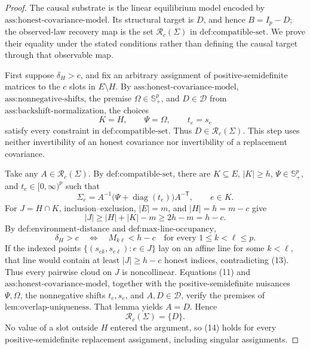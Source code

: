 \documentclass{article}
\begin{document}
\begin{proof}
The causal substrate is the linear equilibrium model encoded by \(\text{ass:honest-covariance-model}\).  Its structural target is \(D\), and hence \(B=I_p-D\); the observed-law recovery map is the set \(\mathcal R_c(\Sigma)\) in \(\text{def:compatible-set}\).  We prove their equality under the stated conditions rather than defining the causal target through that observable map.

First suppose \(\delta_H>c\), and fix an arbitrary assignment of positive-semidefinite matrices to the \(c\) slots in \(E\setminus H\).  By \(\text{ass:honest-covariance-model}\), \(\text{ass:nonnegative-shifts}\), the premise \(\Omega\in\mathbb S_+^p\), and \(D\in\mathcal D\) from \(\text{ass:backshift-normalization}\), the choices
\[
 K=H,
 \qquad \Psi=\Omega,
 \qquad t_e=s_e
\]
satisfy every constraint in \(\text{def:compatible-set}\).  Thus \(D\in\mathcal R_c(\Sigma)\).  This step uses neither invertibility of an honest covariance nor invertibility of a replacement covariance.

Take any \(A\in\mathcal R_c(\Sigma)\).  By \(\text{def:compatible-set}\), there are \(K\subseteq E\), \(|K|\ge h\), \(\Psi\in\mathbb S_+^p\), and \(t_e\in[0,\infty)^p\) such that
\[
 \Sigma_e=A^{-1}\bigl(\Psi+\operatorname{diag}(t_e)\bigr)A^{-\mathsf T},
 \qquad e\in K.
 \tag{11}
\]
For \(J=H\cap K\), inclusion--exclusion, \(|E|=m\), and \(|H|=h=m-c\) give
\[
 |J|\ge |H|+|K|-m\ge2h-m=h-c.
 \tag{12}
\]
By \(\text{def:environment-distance}\) and \(\text{def:max-line-occupancy}\),
\[
 \delta_H>c
 \quad\Longleftrightarrow\quad
 M_{k\ell}<h-c
 \quad\text{for every }1\le k<\ell\le p.
 \tag{13}
\]
If the indexed points \(\{(s_{ek},s_{e\ell}):e\in J\}\) lay on an affine line for some \(k<\ell\), that line would contain at least \(|J|\ge h-c\) honest indices, contradicting (13).  Thus every pairwise cloud on \(J\) is noncollinear.  Equations (11) and \(\text{ass:honest-covariance-model}\), together with the positive-semidefinite nuisances \(\Psi,\Omega\), the nonnegative shifts \(t_e,s_e\), and \(A,D\in\mathcal D\), verify the premises of \(\text{lem:overlap-uniqueness}\).  That lemma yields \(A=D\).  Hence
\[
 \mathcal R_c(\Sigma)=\{D\}.
 \tag{14}
\]
No value of a slot outside \(H\) entered the argument, so (14) holds for every positive-semidefinite replacement assignment, including singular assignments.


\end{proof}
\end{document}

